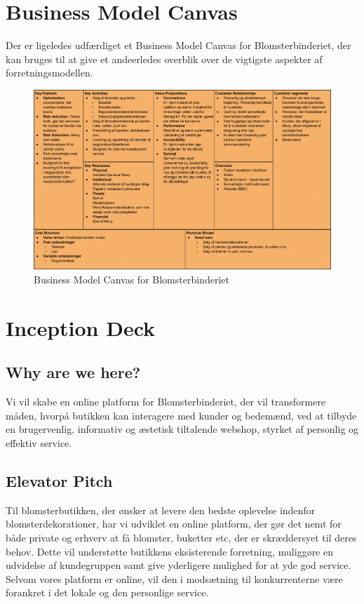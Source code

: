 \section{Business Model Canvas}
Der er ligeledes udfærdiget et Business Model Canvas for Blomsterbinderiet, der kan bruges til at give et andeerledes overblik over de vigtigste aspekter af forretningsmodellen.
\begin{figure}[H]
    \centering
    \includegraphics[width=1\textwidth]{figures/business/bmc1.png}
    \caption{Business Model Canvas for Blomsterbinderiet}
    \label{fig:bmc1}
\end{figure}

\section{Inception Deck}

\subsection{Why are we here?}
Vi vil skabe en online platform for Blomsterbinderiet, der vil transformere måden, 
hvorpå butikken kan interagere med kunder og bedemænd, ved at tilbyde en brugervenlig, 
informativ og æstetisk tiltalende webshop, styrket af personlig og effektiv service.

\subsection{Elevator Pitch}
Til blomsterbutikken, der ønsker at levere den bedste oplevelse indenfor blomsterdekorationer, 
har vi udviklet en online platform, der gør det nemt for både private og erhverv at få blomster, buketter etc, der er skræddersyet til deres behov.
Dette vil understøtte butikkens eksisterende forretning, muliggøre en udvidelse af kundegruppen samt give yderligere mulighed for at yde god service.
Selvom vores platform er online, vil den i modsætning til konkurrenterne være forankret i det lokale og den personlige service.

